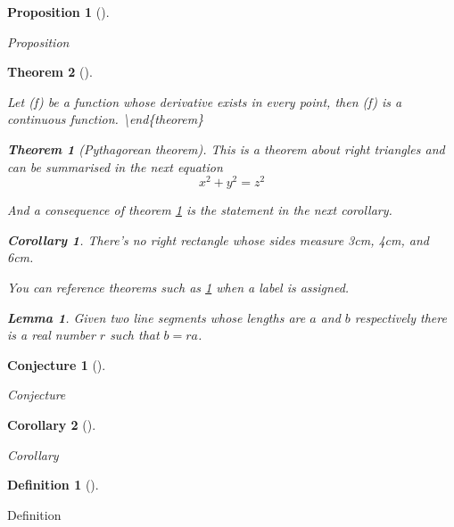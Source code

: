 \documentclass[
  12pt,
  a4paper,
  oneside,
  titlepage,
  toclink=all,
  toc=bibliography]{scrbook}
\theoremstyle{definition}
\newtheorem{definition}{Definition}[section]
\theoremstyle{plain}
\newtheorem{corollary}{Corollary}[section]
\theoremstyle{plain}
\newtheorem{conjecture}{Conjecture}[section]
\theoremstyle{plain}
\newtheorem{theorem}{Theorem}[section]
\theoremstyle{plain}
\newtheorem{proposition}{Proposition}[section]
\theoremstyle{definition}
\theoremstyle{definition}
\theoremstyle{plain}
\newtheorem{lemma}{Lemma}[section]
\theoremstyle{remark}
\begin{document}
\begin{proposition}[]\protect\hypertarget{prp-scriv4}{}\label{prp-scriv4}

Proposition

\end{proposition}

\begin{theorem}[]\protect\hypertarget{thm-scriv4}{}\label{thm-scriv4}

Let (f) be a function whose derivative exists in every point, then (f)
is a continuous function. \textbackslash end\{theorem\}

\begin{theorem}[Pythagorean theorem]
\label{pythagorean}
This is a theorem about right triangles and can be summarised in the next 
equation 
\[ x^2 + y^2 = z^2 \]
\end{theorem}

And a consequence of theorem \ref{pythagorean} is the statement in the
next corollary.

\begin{corollary}
There's no right rectangle whose sides measure 3cm, 4cm, and 6cm.
\end{corollary}

You can reference theorems such as \ref{pythagorean} when a label is
assigned.

\begin{lemma}
Given two line segments whose lengths are \(a\) and \(b\) respectively there is a 
real number \(r\) such that \(b=ra\).
\end{lemma}

\end{theorem}

\begin{conjecture}[]\protect\hypertarget{cnj-scriv4}{}\label{cnj-scriv4}

Conjecture

\end{conjecture}

\begin{corollary}[]\protect\hypertarget{cor-scriv4}{}\label{cor-scriv4}

Corollary

\end{corollary}

\begin{definition}[]\protect\hypertarget{def-scriv4}{}\label{def-scriv4}

Definition

\end{definition}
\end{document}
